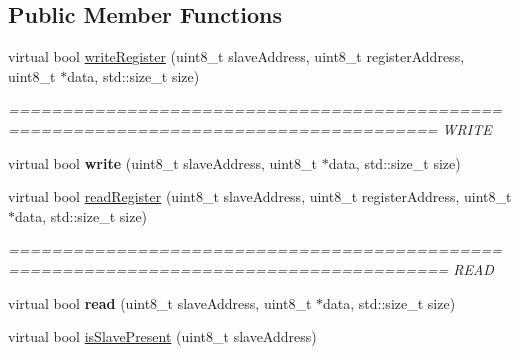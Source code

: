 \subsection*{Public Member Functions}
\begin{DoxyCompactItemize}
\item 
\hypertarget{classyahal_1_1mcu_1_1_i2_c__master_a50d197cc66ef0825bed15f67b16a701b}{}virtual bool \hyperlink{classyahal_1_1mcu_1_1_i2_c__master_a50d197cc66ef0825bed15f67b16a701b}{write\+Register} (uint8\+\_\+t slave\+Address, uint8\+\_\+t register\+Address, uint8\+\_\+t $\ast$data, std\+::size\+\_\+t size)\label{classyahal_1_1mcu_1_1_i2_c__master_a50d197cc66ef0825bed15f67b16a701b}

\begin{DoxyCompactList}\small\item\em ====================================================================================== W\+R\+I\+T\+E \end{DoxyCompactList}\item 
\hypertarget{classyahal_1_1mcu_1_1_i2_c__master_a7ea7f55c54c1f6bcb7224ab06dc45d64}{}virtual bool {\bfseries write} (uint8\+\_\+t slave\+Address, uint8\+\_\+t $\ast$data, std\+::size\+\_\+t size)\label{classyahal_1_1mcu_1_1_i2_c__master_a7ea7f55c54c1f6bcb7224ab06dc45d64}

\item 
\hypertarget{classyahal_1_1mcu_1_1_i2_c__master_a63300f623b504d6ec969b4e76764fb02}{}virtual bool \hyperlink{classyahal_1_1mcu_1_1_i2_c__master_a63300f623b504d6ec969b4e76764fb02}{read\+Register} (uint8\+\_\+t slave\+Address, uint8\+\_\+t register\+Address, uint8\+\_\+t $\ast$data, std\+::size\+\_\+t size)\label{classyahal_1_1mcu_1_1_i2_c__master_a63300f623b504d6ec969b4e76764fb02}

\begin{DoxyCompactList}\small\item\em ======================================================================================= R\+E\+A\+D \end{DoxyCompactList}\item 
\hypertarget{classyahal_1_1mcu_1_1_i2_c__master_a4550ee5d6613d0fd76ea1750b3ed5935}{}virtual bool {\bfseries read} (uint8\+\_\+t slave\+Address, uint8\+\_\+t $\ast$data, std\+::size\+\_\+t size)\label{classyahal_1_1mcu_1_1_i2_c__master_a4550ee5d6613d0fd76ea1750b3ed5935}

\item 
\hypertarget{classyahal_1_1mcu_1_1_i2_c__master_a5917071910d96d6b2f941877daf09d13}{}virtual bool \hyperlink{classyahal_1_1mcu_1_1_i2_c__master_a5917071910d96d6b2f941877daf09d13}{is\+Slave\+Present} (uint8\+\_\+t slave\+Address)\label{classyahal_1_1mcu_1_1_i2_c__master_a5917071910d96d6b2f941877daf09d13}


\end{DoxyCompactItemize}
